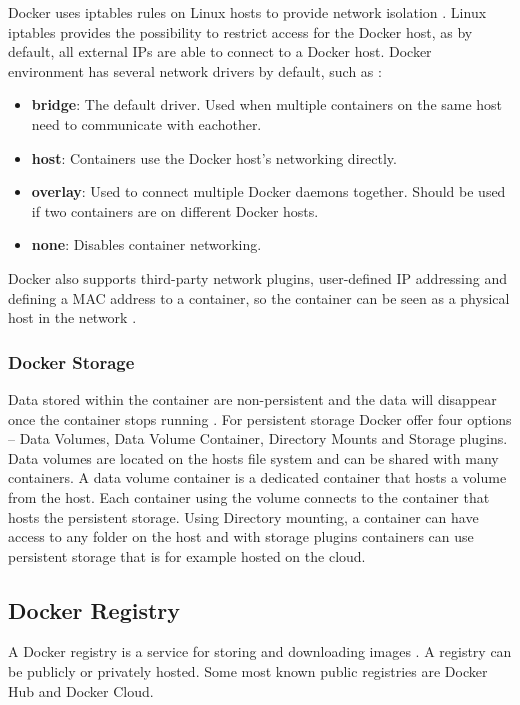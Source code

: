 \documentclass[fleqn,12pt]{olplainarticle}
\begin{document}
Docker uses iptables rules on Linux hosts to provide network isolation \citep{docker:iptables}. Linux iptables provides the possibility to restrict access for the Docker host, as by default, all external IPs are able to connect to a Docker host. Docker environment has several network drivers by default, such as \citep{docker:network}:

\begin{itemize}
    \item \textbf{bridge}: The default driver. Used when multiple containers on the same host need to communicate with eachother.
    \item \textbf{host}: Containers use the Docker host's networking directly.
    \item \textbf{overlay}: Used to connect multiple Docker daemons together. Should be used if two containers are on different Docker hosts.
    \item \textbf{none}: Disables container networking.  
\end{itemize}

Docker also supports third-party network plugins, user-defined IP addressing and defining a MAC address to a container, so the container can be seen as a physical host in the network \citep{docker:network}.

\subsubsection{Docker Storage}

Data stored within the container are non-persistent and the data will disappear once the container stops running \citep{aquasec:docker_architecture}. For persistent storage Docker offer four options – Data Volumes, Data Volume Container, Directory Mounts and Storage plugins. Data volumes are located on the hosts file system and can be shared with many containers. A data volume container is a dedicated container that hosts a volume from the host. Each container using the volume connects to the container that hosts the persistent storage. Using Directory mounting, a container can have access to any folder on the host and with storage plugins containers can use persistent storage that is for example hosted on the cloud.

\subsection{Docker Registry}

A Docker registry is a service for storing and downloading images \citep{aquasec:docker_architecture}. A registry can be publicly or privately hosted. Some most known public registries are Docker Hub and Docker Cloud.
\end{document}
